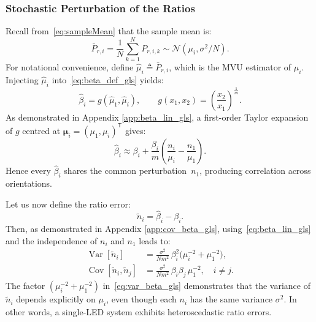 \documentclass[journal]{IEEEtran}
\begin{document}
\subsubsection{Stochastic Perturbation of the Ratios}
Recall from~\eqref{eq:sampleMean} that the sample mean is:
\begin{equation}
\bar P_{r,i}=\frac1N\sum_{k=1}^NP_{r,i,k}
 \sim\mathcal N(\mu_i,\sigma^{2}/N).
\end{equation}
For notational convenience, define $\hat{\mu}_i \triangleq \bar P_{r,i}$, which is the MVU estimator of $\mu_i$.
Injecting $\hat\mu_i$ into~\eqref{eq:beta_def_gls} yields:
\begin{equation}
  \hat\beta_i
  =g(\hat\mu_1,\hat\mu_i),
  \qquad
  g(x_1,x_2)=\left(\frac{x_2}{x_1}\right)^{\frac{1}{m}}.
\end{equation}
As demonstrated in Appendix \ref{app:beta_lin_gls}, a first-order Taylor expansion of $g$ centred at
$\boldsymbol\mu_i=(\mu_1,\mu_i)^{\mathsf T}$ gives:
\begin{equation}
  \hat\beta_i
  \approx
  \beta_i
  +\frac{\beta_i}{m}
   \!\left(\frac{n_i}{\mu_i}-\frac{n_1}{\mu_1}\right).
  \label{eq:beta_lin_gls}
\end{equation}
Hence every $\hat\beta_i$ shares the common perturbation~$n_1$,
producing correlation across orientations.

Let us now define the ratio error:
\begin{equation}
\tilde{n}_i=\hat\beta_i-\beta_i.
\label{eq:ratio_error}
\end{equation}
Then, as demonstrated in Appendix \ref{app:cov_beta_gls}, using~\eqref{eq:beta_lin_gls}
and the independence of $n_i$ and $n_1$ leads to:
\begin{align}
  \operatorname{Var}[\tilde{n}_i]
  &=
  \frac{\sigma^{2}}{Nm^{2}}\,
  \beta_i^{2}\bigl(\mu_i^{-2}+\mu_1^{-2}\bigr),
  \label{eq:var_beta_gls}\\
  \operatorname{Cov}[\tilde{n}_i,\tilde{n}_j]
  &=
  \frac{\sigma^{2}}{Nm^{2}}\,
  \beta_i\beta_j\,\mu_1^{-2},
  \quad i\neq j.
  \label{eq:cov_beta_gls}
\end{align}
The factor $(\mu_i^{-2} + \mu_1^{-2})$ in~\eqref{eq:var_beta_gls}
demonstrates that the variance of $\tilde{n}_i$ depends explicitly on
$\mu_i$, even though each $n_i$ has the same variance
$\sigma^2$. In other words, a single‐LED system exhibits
heteroscedastic ratio errors.
\end{document}
